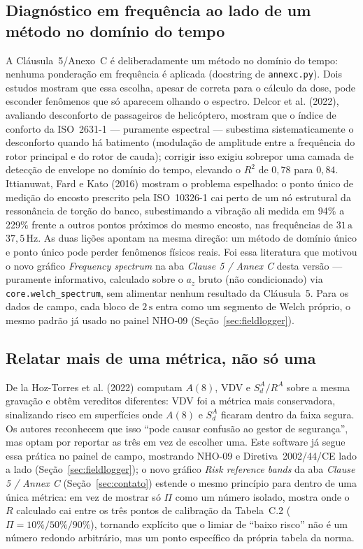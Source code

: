 \documentclass[11pt,a4paper]{article}
\newcommand{\code}[1]{\texttt{\small #1}}
\newcommand{\unit}[2]{\ensuremath{#1\,\mathrm{#2}}}
\begin{document}
\subsection{Diagnóstico em frequência ao lado de um método no domínio do tempo}

A Cláusula~5/Anexo~C é deliberadamente um método no domínio do tempo: nenhuma
ponderação em frequência é aplicada (docstring de \code{annexc.py}). Dois
estudos mostram que essa escolha, apesar de correta para o cálculo da dose,
pode esconder fenômenos que só aparecem olhando o espectro. Delcor et al.
(2022), avaliando desconforto de passageiros de helicóptero, mostram que o
índice de conforto da ISO~2631-1 --- puramente espectral --- subestima
sistematicamente o desconforto quando há batimento (modulação de amplitude
entre a frequência do rotor principal e do rotor de cauda); corrigir isso
exigiu sobrepor uma camada de detecção de envelope no domínio do tempo,
elevando o $R^2$ de $0{,}78$ para $0{,}84$. Ittianuwat, Fard e Kato (2016)
mostram o problema espelhado: o ponto único de medição do encosto prescrito
pela ISO~10326-1 cai perto de um nó estrutural da ressonância de torção do
banco, subestimando a vibração ali medida em 94\% a 229\% frente a outros
pontos próximos do mesmo encosto, nas frequências de \unit{31}{a}
\unit{37{,}5}{Hz}. As duas lições apontam na mesma direção: um método de
domínio único e ponto único pode perder fenômenos físicos reais. Foi essa
literatura que motivou o novo gráfico \emph{Frequency spectrum} na aba
\emph{Clause 5 / Annex C} desta versão --- puramente informativo, calculado
sobre o $a_z$ bruto (não condicionado) via \code{core.welch\_spectrum}, sem
alimentar nenhum resultado da Cláusula~5. Para os dados de campo, cada bloco de
\unit{2}{s} entra como um segmento de Welch próprio, o mesmo padrão já usado no
painel NHO-09 (Seção~\ref{sec:fieldlogger}).

\subsection{Relatar mais de uma métrica, não só uma}

De la Hoz-Torres et al. (2022) computam $A(8)$, VDV e $S_d^A/R^A$ sobre a
mesma gravação e obtêm vereditos diferentes: VDV foi a métrica mais
conservadora, sinalizando risco em superfícies onde $A(8)$ e $S_d^A$ ficaram
dentro da faixa segura. Os autores reconhecem que isso ``pode causar confusão
ao gestor de segurança'', mas optam por reportar as três em vez de escolher
uma. Este software já segue essa prática no painel de campo, mostrando
NHO-09 e Diretiva~2002/44/CE lado a lado (Seção~\ref{sec:fieldlogger}); o novo
gráfico \emph{Risk reference bands} da aba \emph{Clause 5 / Annex C}
(Seção~\ref{sec:contato}) estende o mesmo princípio para dentro de uma única
métrica: em vez de mostrar só $\Pi$ como um número isolado, mostra onde o $R$
calculado cai entre os três pontos de calibração da Tabela~C.2
($\Pi = 10\%/50\%/90\%$), tornando explícito que o limiar de ``baixo risco''
não é um número redondo arbitrário, mas um ponto específico da própria tabela
da norma.
\end{document}
